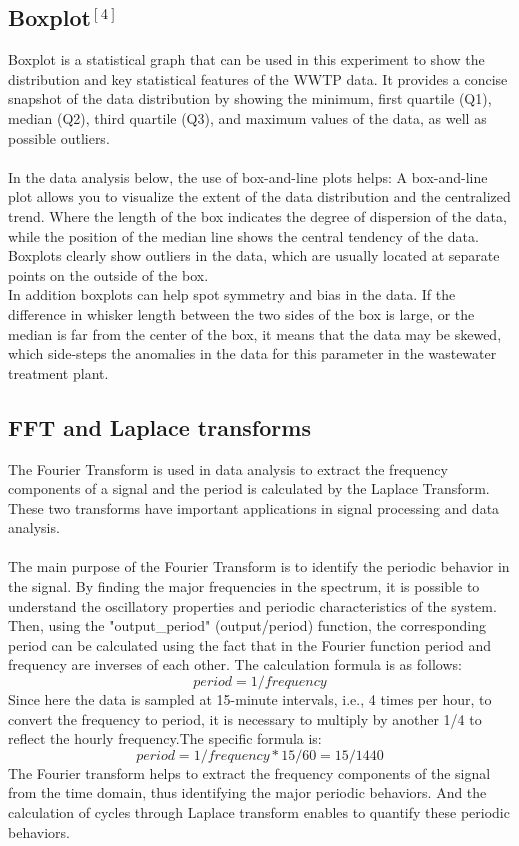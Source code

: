 \documentclass[]{iat}
\begin{document}
\subsection{Boxplot$^{[4]}$}
Boxplot is a statistical graph that can be used in this experiment to show the distribution and key statistical features of the WWTP data. It provides a concise snapshot of the data distribution by showing the minimum, first quartile (Q1), median (Q2), third quartile (Q3), and maximum values of the data, as well as possible outliers.\\
\\
In the data analysis below, the use of box-and-line plots helps:
A box-and-line plot allows you to visualize the extent of the data distribution and the centralized trend. Where the length of the box indicates the degree of dispersion of the data, while the position of the median line shows the central tendency of the data.\\
Boxplots clearly show outliers in the data, which are usually located at separate points on the outside of the box.\\
In addition boxplots can help spot symmetry and bias in the data. If the difference in whisker length between the two sides of the box is large, or the median is far from the center of the box, it means that the data may be skewed, which side-steps the anomalies in the data for this parameter in the wastewater treatment plant.
\subsection{FFT and Laplace transforms}
The Fourier Transform is used in data analysis to extract the frequency components of a signal and the period is calculated by the Laplace Transform. These two transforms have important applications in signal processing and data analysis.\\
\\
The main purpose of the Fourier Transform is to identify the periodic behavior in the signal. By finding the major frequencies in the spectrum, it is possible to understand the oscillatory properties and periodic characteristics of the system. Then, using the "output\_period" (output/period) function, the corresponding period can be calculated using the fact that in the Fourier function period and frequency are inverses of each other. The calculation formula is as follows:\\
\begin{equation}
period = 1/frequency
\end{equation}
Since here the data is sampled at 15-minute intervals, i.e., 4 times per hour, to convert the frequency to period, it is necessary to multiply by another 1/4 to reflect the hourly frequency.The specific formula is:\\
\begin{equation}
period = 1/frequency * 15/60 = 15/1440
\end{equation}
The Fourier transform helps to extract the frequency components of the signal from the time domain, thus identifying the major periodic behaviors. And the calculation of cycles through Laplace transform enables to quantify these periodic behaviors.
\end{document}
